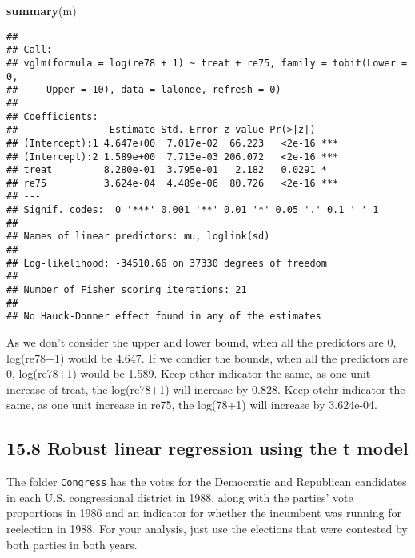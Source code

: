 \documentclass[
]{article}
\newenvironment{Shaded}{\begin{snugshade}}{\end{snugshade}}
\newcommand{\AttributeTok}[1]{\textcolor[rgb]{0.13,0.29,0.53}{#1}}
\newcommand{\FunctionTok}[1]{\textcolor[rgb]{0.13,0.29,0.53}{\textbf{#1}}}
\newcommand{\NormalTok}[1]{#1}
\newcommand{\OtherTok}[1]{\textcolor[rgb]{0.56,0.35,0.01}{#1}}
\newcommand{\SpecialCharTok}[1]{\textcolor[rgb]{0.81,0.36,0.00}{\textbf{#1}}}
\newcommand{\StringTok}[1]{\textcolor[rgb]{0.31,0.60,0.02}{#1}}
\begin{document}
\begin{Shaded}
\begin{Highlighting}[]
\FunctionTok{summary}\NormalTok{(m)}
\end{Highlighting}
\end{Shaded}

\begin{verbatim}
## 
## Call:
## vglm(formula = log(re78 + 1) ~ treat + re75, family = tobit(Lower = 0, 
##     Upper = 10), data = lalonde, refresh = 0)
## 
## Coefficients: 
##                Estimate Std. Error z value Pr(>|z|)    
## (Intercept):1 4.647e+00  7.017e-02  66.223   <2e-16 ***
## (Intercept):2 1.589e+00  7.713e-03 206.072   <2e-16 ***
## treat         8.280e-01  3.795e-01   2.182   0.0291 *  
## re75          3.624e-04  4.489e-06  80.726   <2e-16 ***
## ---
## Signif. codes:  0 '***' 0.001 '**' 0.01 '*' 0.05 '.' 0.1 ' ' 1
## 
## Names of linear predictors: mu, loglink(sd)
## 
## Log-likelihood: -34510.66 on 37330 degrees of freedom
## 
## Number of Fisher scoring iterations: 21 
## 
## No Hauck-Donner effect found in any of the estimates
\end{verbatim}

As we don't consider the upper and lower bound, when all the predictors
are 0, log(re78+1) would be 4.647. If we condier the bounds, when all
the predictors are 0, log(re78+1) would be 1.589. Keep other indicator
the same, as one unit increase of treat, the log(re78+1) will increase
by 0.828. Keep otehr indicator the same, as one unit increase in re75,
the log(78+1) will increase by 3.624e-04.

\hypertarget{robust-linear-regression-using-the-t-model}{%
\subsection{15.8 Robust linear regression using the t
model}\label{robust-linear-regression-using-the-t-model}}

The folder \texttt{Congress} has the votes for the Democratic and
Republican candidates in each U.S. congressional district in 1988, along
with the parties' vote proportions in 1986 and an indicator for whether
the incumbent was running for reelection in 1988. For your analysis,
just use the elections that were contested by both parties in both
years.

\begin{Shaded}
\end{Shaded}
\end{document}
